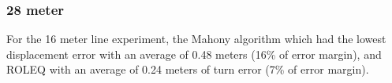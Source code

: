 \begin{figure}[!h]
    \centering
    
\end{figure}

\subsubsection{28 meter}

For the 16 meter line experiment, the Mahony algorithm which had the lowest displacement error with an average of 0.48 meters (16\% of error margin), and ROLEQ with an average of 0.24 meters of turn error (7\% of error margin).


\begin{figure}[!h]
    \centering
    
\end{figure}


%     


%     
